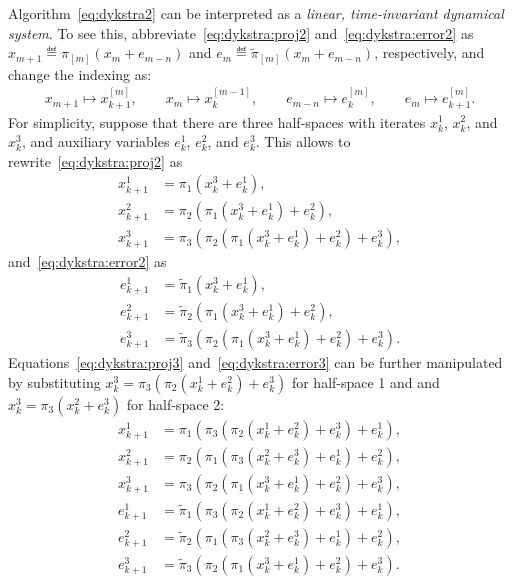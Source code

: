 \documentclass[hidelinks]{article}
\begin{document}
Algorithm~\eqref{eq:dykstra2} can be interpreted as a \textit{linear, time-invariant dynamical system}. To see this, abbreviate~\eqref{eq:dykstra:proj2} and~\eqref{eq:dykstra:error2} as $x_{m+1}\eqdef\pi_{[m]}(x_{m}+e_{m-n})$ and $e_{m}\eqdef\tilde{\pi}_{[m]}(x_{m}+e_{m-n})$, respectively, and change the indexing as:
\begin{align}
x_{m+1} \mapsto x_{k+1}^{[m]},\qquad x_{m} \mapsto x_{k}^{[m-1]},\qquad
e_{m-n} \mapsto e_{k}^{[m]},\qquad e_{m} \mapsto e_{k+1}^{[m]}.
\end{align}
For simplicity, suppose that there are three half-spaces with iterates $x_k^1$, $x_k^2$, and $x_k^3$, and auxiliary variables $e_k^1$, $e_k^2$, and $e_k^3$. This allows to rewrite~\eqref{eq:dykstra:proj2} as
\begin{subequations}
\begin{align}
x_{k+1}^1 &= \pi_1(x_k^3+e_k^1),\\
x_{k+1}^2 &= \pi_2(\pi_1(x_k^3+e_k^1)+e_k^2),\\
x_{k+1}^3 &= \pi_3(\pi_2(\pi_1(x_k^3+e_k^1)+e_k^2)+e_k^3),
\end{align}\label{eq:dykstra:proj3}
\end{subequations}
and~\eqref{eq:dykstra:error2} as
\begin{subequations}
\begin{align}
e_{k+1}^1 &= \tilde{\pi}_1(x_k^3+e_k^1),\\
e_{k+1}^2 &= \tilde{\pi}_2(\pi_1(x_k^3+e_k^1)+e_k^2),\\
e_{k+1}^3 &= \tilde{\pi}_3(\pi_2(\pi_1(x_k^3+e_k^1)+e_k^2)+e_k^3).
\end{align}\label{eq:dykstra:error3}
\end{subequations}
Equations~\eqref{eq:dykstra:proj3} and~\eqref{eq:dykstra:error3} can be further manipulated by substituting $x_k^3=\pi_3(\pi_2(x_k^1+e_k^2)+e_k^3)$ for half-space 1 and and $x_k^3=\pi_3(x_k^2+e_k^3)$ for half-space 2:
\begin{subequations}
\begin{align}
x_{k+1}^1 &= \pi_1(\pi_3(\pi_2(x_k^1+e_k^2)+e_k^3)+e_k^1),\\
x_{k+1}^2 &= \pi_2(\pi_1(\pi_3(x_k^2+e_k^3)+e_k^1)+e_k^2),\\
x_{k+1}^3 &= \pi_3(\pi_2(\pi_1(x_k^3+e_k^1)+e_k^2)+e_k^3),\\
e_{k+1}^1 &= \tilde{\pi}_1(\pi_3(\pi_2(x_k^1+e_k^2)+e_k^3)+e_k^1),\\
e_{k+1}^2 &= \tilde{\pi}_2(\pi_1(\pi_3(x_k^2+e_k^3)+e_k^1)+e_k^2),\\
e_{k+1}^3 &= \tilde{\pi}_3(\pi_2(\pi_1(x_k^3+e_k^1)+e_k^2)+e_k^3).
\end{align}\label{eq:dykstra4}
\end{subequations}
\end{document}
